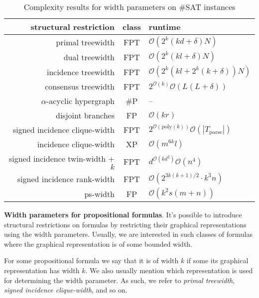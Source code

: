 \documentclass{article}
\begin{document}
\begin{table}
	\centering
	\begin{tabular}{r | c | l}
		\textbf{structural restriction} & \textbf{class} & \textbf{runtime} \\
		\hline
		primal treewidth \cite{DBLP:journals/jda/SamerS10} & FPT  & $\mathcal{O}(2^k(kd+\delta)N)$ \\
		dual treewidth \cite{DBLP:journals/jda/SamerS10} & FPT & $\mathcal{O}(2^k(kl+\delta)N)$ \\
		incidence treewidth \cite{DBLP:journals/jda/SamerS10} & FPT & $\mathcal{O}(2^k(kl+2^k(k+\delta))N)$ \\
		consensus treewidth \cite{DBLP:conf/sat/GanianS17} & FPT  & $2^{\mathcal{O}(k)}\mathcal{O}(L(L+\delta))$ \\
		\hline
		$\alpha$-acyclic hypergraph \cite{DBLP:conf/sat/CapelliDM14} & \#P  & -- \\
		disjoint branches \cite{DBLP:conf/sat/CapelliDM14} & FP & $\mathcal{O}(kr)$ \\
		\hline
		signed incidence clique-width \cite{DBLP:journals/dam/FischerMR08} & FPT & $2^{\mathcal{O}(\text{poly}(k))} \mathcal{O}(|T_{\text{parse}}|)$ \\
		incidence clique-width \cite{DBLP:conf/isaac/SlivovskyS13} & XP & $\mathcal{O}(m^{6k} l)$ \\
		\hline
		signed incidence twin-width + $k$ \cite{DBLP:conf/sat/GanianPSSS22} & FPT & $d^{\mathcal{O}(kd^2)}\mathcal{O}(n^4)$ \\
		signed incidence rank-width \cite{DBLP:journals/fuin/GanianHO13} & FPT & $\mathcal{O}(2^{3k(k+1)/2}\cdot k^3 n)$ \\
		ps-width \cite{DBLP:conf/sat/SaetherTV14} & FP & $\mathcal{O}(k^2s(m+n))$
	\end{tabular}
	\caption{Complexity results for width parameters on \#SAT instances}
	\label{table:complexity}
\end{table}

\noindent
\textbf{Width parameters for propositional formulas}.
It's possible to introduce structural restrictions on formulas by restricting their graphical representations using the width parameters.
Usually, we are interested in such classes of formulas where the graphical representation is of some bounded width.

For some propositional formula we say that it is of width $k$ if some its graphical representation has width $k$.
We also usually mention which representation is used for determining the width parameter. As such, we refer to {\em primal treewidth}, {\em signed incidence clique-width}, and so on.
\end{document}

